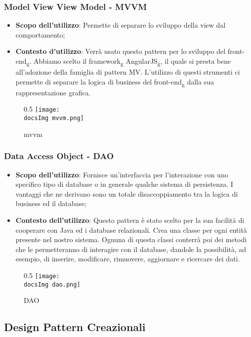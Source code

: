 		\subsubsection{Model View View Model - MVVM}
			\begin{itemize}
				\item \textbf{Scopo dell'utilizzo}: Permette di separare lo sviluppo della view dal comportamento;
				\item \textbf{Contesto d'utilizzo}: Verrà usato questo pattern per lo sviluppo del front-end\textsubscript{g}. Abbiamo scelto il framework\textsubscript{g} AngularJS\textsubscript{g}, il quale si presta bene all'adozione della famiglia di pattern MV. L'utilizzo di questi strumenti ci permette di separare la logica di business del front-end\textsubscript{g} dalla sua rappresentazione grafica.
			\end{itemize}
			\begin{figure}[h]{0.5}
				\centering
				\texttt{[image: \\docsImg mvvm.png]}
				\caption{mvvm}
				\label{fig. Mvvm}
			\end{figure}

		\subsubsection{Data Access Object - DAO }
		\begin{itemize}\itemsep1pt
				\item \textbf{Scopo dell'utilizzo}: Fornisce un'interfaccia per l'interazione con uno specifico tipo di database o in generale qualche sistema di persistenza. I vantaggi che ne derivano sono un totale disaccoppiamento tra la logica di business ed il database;
				\item \textbf{Contesto dell'utilizzo}: Questo pattern è stato scelto per la sua facilità di cooperare con Java ed i database relazionali. Crea una classe per ogni entità presente nel nostro sistema. Ognuna di questa classi conterrà poi dei metodi che le permetteranno di interagire con il database, dandole la possibilità, ad esempio, di inserire, modificare, rimuovere, aggiornare e ricercare dei dati.
		\end{itemize}
		\begin{figure}[h]{0.5}
			\centering
			\texttt{[image: \\docsImg dao.png]}
			\caption{DAO}
			\label{fig. Data Access Object - DAO}
		\end{figure}
	\subsection{Design Pattern Creazionali}
		
